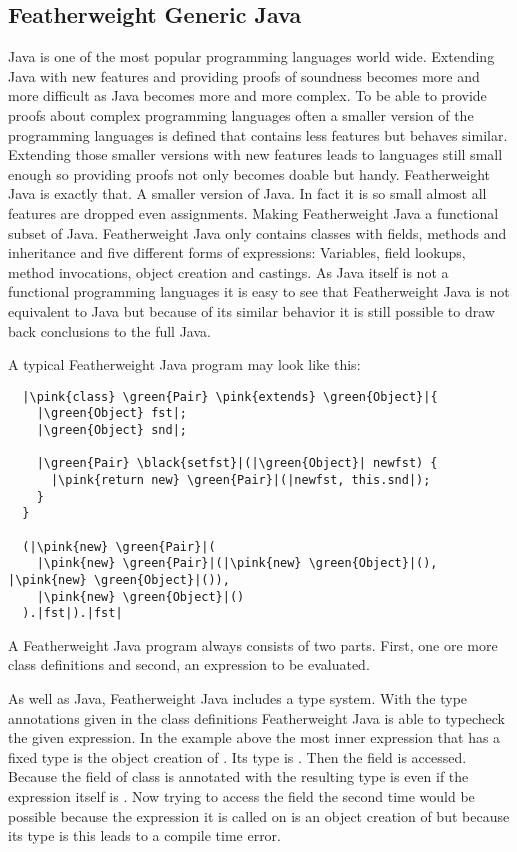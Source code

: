 \subsection{Featherweight Generic Java}
Java is one of the most popular programming languages world wide. Extending Java with new features and providing proofs of soundness becomes more and more difficult as Java becomes more and more complex.
To be able to provide proofs about complex programming languages often a smaller version of the programming languages is defined that contains less features but behaves similar.
Extending those smaller versions with new features leads to languages still small enough so providing proofs not only becomes doable but handy.
Featherweight Java is exactly that. A smaller version of Java. In fact it is so small almost all features are dropped even assignments. Making Featherweight Java a functional subset of Java.
Featherweight Java only contains classes with fields, methods and inheritance and five different forms of expressions: Variables, field lookups, method invocations, object creation and castings.
As Java itself is not a functional programming languages it is easy to see that Featherweight Java is not equivalent to Java but because of its similar behavior it is still possible to draw back conclusions to the full Java.

A typical Featherweight Java program may look like this:

\begin{verbatim}
  |\pink{class} \green{Pair} \pink{extends} \green{Object}|{
    |\green{Object} fst|;
    |\green{Object} snd|;

    |\green{Pair} \black{setfst}|(|\green{Object}| newfst) {
      |\pink{return new} \green{Pair}|(|newfst, this.snd|);
    }
  }

  (|\pink{new} \green{Pair}|(
    |\pink{new} \green{Pair}|(|\pink{new} \green{Object}|(), |\pink{new} \green{Object}|()),
    |\pink{new} \green{Object}|()
  ).|fst|).|fst|
\end{verbatim}

A Featherweight Java program always consists of two parts. First, one ore more class definitions and second, an expression to be evaluated.

As well as Java, Featherweight Java includes a type system. With the type annotations given in the class definitions Featherweight Java is able to typecheck the given expression.
In the example above the most inner expression that has a fixed type is the object creation of . Its type is .
Then the field  is accessed. Because the field  of class  is annotated with  the resulting type is  even if the expression itself is .
Now trying to access the field  the second time would be possible because the expression it is called on is an object creation of  but because its type is  this leads to a compile time error.

